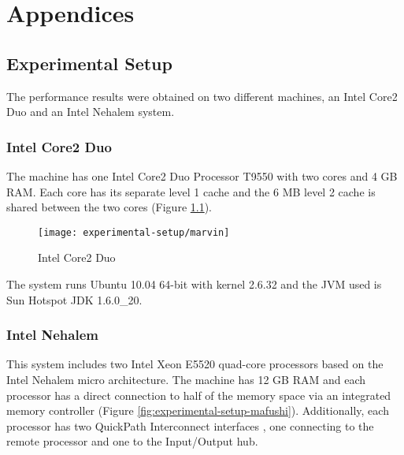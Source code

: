 
\part{Appendices}
\label{part:appendices}

\chapter{Experimental Setup}
\label{chap:experimental-setup}

The performance results were obtained on two different machines, an
Intel Core2 Duo and an Intel Nehalem system.

\section{Intel Core2 Duo}
\label{sec:experimental-setup-marvin}

The machine has one Intel Core2 Duo Processor T9550 with two cores and
4 GB RAM. Each core has its separate level 1 cache and the 6 MB level
2 cache is shared between the two cores (Figure
\ref{fig:experimental-setup-marvin}).

\begin{figure}[htb]
  \centering
  \texttt{[image: experimental-setup/marvin]}
  \caption{Intel Core2 Duo}
  \label{fig:experimental-setup-marvin}
\end{figure}

The system runs Ubuntu 10.04 64-bit with kernel 2.6.32 and the JVM
used is Sun Hotspot JDK 1.6.0\_20.

\section{Intel Nehalem}
\label{sec:experimental-setup-mafushi}

This system includes two Intel Xeon E5520 quad-core processors based
on the Intel Nehalem micro architecture. The machine has 12 GB RAM and
each processor has a direct connection to half of the memory space via
an integrated memory controller (Figure
\ref{fig:experimental-setup-mafushi}). Additionally, each processor
has two QuickPath Interconnect interfaces \cite{Maddox2009}, one
connecting to the remote processor and one to the Input/Output hub.

